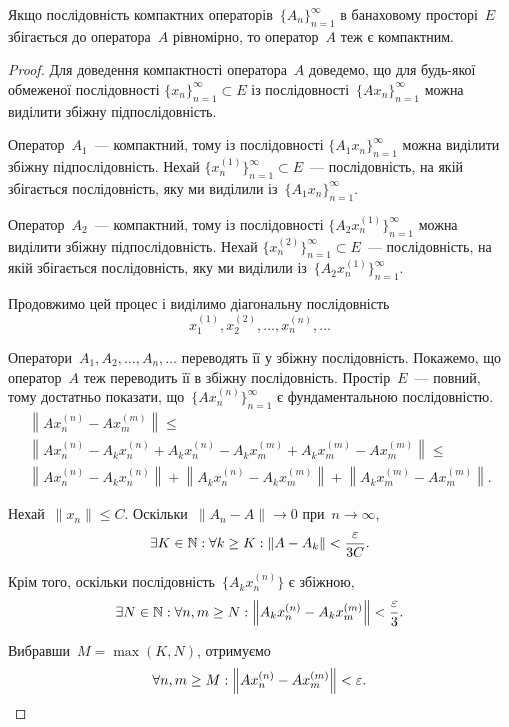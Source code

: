 \begin{theorem}
Якщо послідовність компактних
операторів~$\{A_n\}_{n = 1}^\infty$
в банаховому просторі~$E$ збігається
до оператора~$A$ рівномірно, то оператор~$A$ теж є
компактним.
\end{theorem}

\begin{proof}
Для доведення компактності оператора~$A$
доведемо, що для будь-якої обмеженої послідовності
$\{x_n\}_{n = 1}^\infty \subset E$ із послідовності~$\{Ax_n\}_{n = 1}^\infty$
можна виділити збіжну підпослідовність.

Оператор~$A_1$~--- компактний, тому із послідовності
$\{A_1 x_n\}_{n = 1}^\infty$
можна виділити збіжну підпослідовність. Нехай
$\{x_n^{(1)}\}_{n = 1}^\infty \subset E$~--- послідовність, на якій збігається
послідовність, яку ми виділили із~$\{A_1 x_n\}_{n = 1}^\infty$.

Оператор~$A_2$~--- компактний, тому із послідовності
$\{A_2 x_n^{(1)}\}_{n = 1}^\infty$
можна виділити збіжну підпослідовність. Нехай
$\{x_n^{(2)}\}_{n = 1}^\infty \subset E$~--- послідовність, на якій збігається
послідовність, яку ми виділили із~$\{A_2 x_n^{(1)}\}_{n = 1}^\infty$.

Продовжимо цей процес і виділимо діагональну
послідовність
\begin{equation*}
    x_1^{(1)}, x_2^{(2)}, \dots, x_n^{(n)}, \dots
\end{equation*}

Оператори~$A_1, A_2, \dots, A_n, \dots$ переводять її у збіжну
послідовність. Покажемо, що оператор~$A$ теж переводить її
в збіжну послідовність. Простір~$E$~--- повний, тому
достатньо показати, що~$\{Ax_n^{(n)}\}_{n = 1}^\infty$
є фундаментальною послідовністю.
\begin{multline*}
    \left\|A x_n^{(n)} - A x_m^{(m)}\right\| \le \\
    \left\|A x_n^{(n)} - A_k x_n^{(n)} +
      A_k x_n^{(n)} - A_k x_m^{(m)} +
      A_k x_m^{(m)} - A x_m^{(m)} \right\| \le \\
    \left\|A x_n^{(n)} - A_k x_n^{(n)}\right\| +
    \left\|A_k x_n^{(n)} - A_k x_m^{(m)}\right\| +
    \left\|A_k x_m^{(m)} - A x_m^{(m)} \right\|.
\end{multline*}

Нехай~$\|x_n\| \le C$. Оскільки~$\|A_n - A\| \to 0$ при~$n \to \infty$,
\begin{equation*}
    \exists K \in \NN: \forall k \ge K:
    \left\|A - A_k\right\| < \frac{\epsilon}{3C}.
\end{equation*}

Крім того, оскільки послідовність~$\{A_k x_n^{(n)}\}$ є збіжною,
\begin{equation*}
    \exists N \in \NN: \forall n, m \ge N:
    \left\|A_k x_n^{(n)} - A_k x_m^{(m)} \right\| < \frac{\epsilon}{3}.
    \end{equation*}

Вибравши~$M = \max(K, N)$, отримуємо
\begin{equation*}
    \forall n, m \ge M:
    \left\|A x_n^{(n)} - A x_m^{(m)}\right\| < \epsilon. \qedhere
\end{equation*}
\end{proof}

